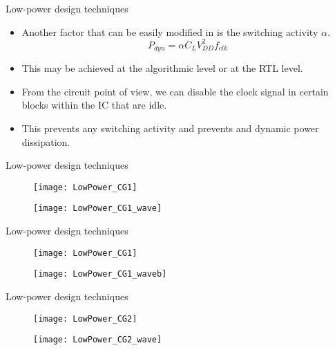 \documentclass[]{slides}
\begin{document}
\begin{frame}{Low-power design techniques}{}
\begin{itemize}
\item Another factor that can be easily modified in  is the switching activity $\alpha$.
\begin{equation*}
P_{dyn} = \alpha C_{L} V_{DD}^{2} f_{clk}
\end{equation*}
\item This may be achieved at the algorithmic level or at the \ac{RTL} level.
\item From the circuit point of view, we can disable the clock signal in certain blocks within the \ac{IC} that are idle.\\
\item This prevents any switching activity  and prevents and dynamic power dissipation.
\end{itemize}
\end{frame}

\begin{frame}{Low-power design techniques}{}
\vspace{-5pt}
\begin{figure}
\texttt{[image: LowPower\_CG1]}
\end{figure}
\vspace{-15pt}
\begin{figure}
\texttt{[image: LowPower\_CG1\_wave]}
\end{figure}
\end{frame}

\begin{frame}{Low-power design techniques}{}
\vspace{-5pt}
\begin{figure}
\texttt{[image: LowPower\_CG1]}
\end{figure}
\vspace{-15pt}
\begin{figure}
\texttt{[image: LowPower\_CG1\_waveb]}
\end{figure}
\end{frame}

\begin{frame}{Low-power design techniques}{}
\vspace{-5pt}
\begin{figure}
\texttt{[image: LowPower\_CG2]}
\end{figure}
\vspace{-10pt}
\begin{figure}
\texttt{[image: LowPower\_CG2\_wave]}
\end{figure}
\end{frame}
\end{document}
